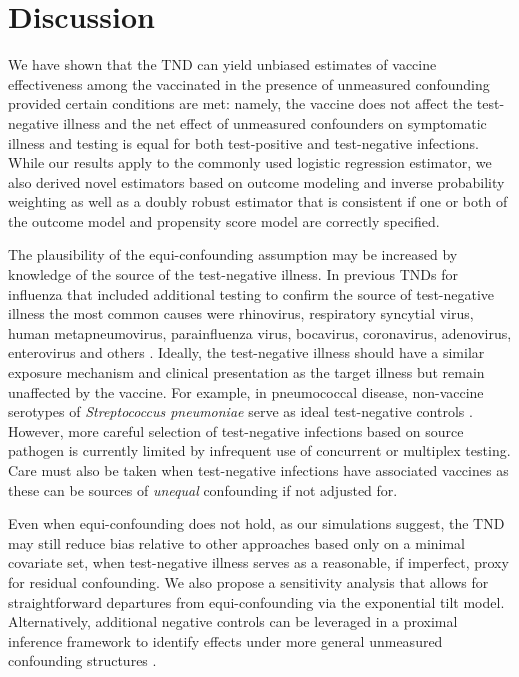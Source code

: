 \documentclass[11pt]{article}
\begin{document}
\section*{Discussion} \label{sec:discussion}

We have shown that the TND can yield unbiased estimates of vaccine effectiveness among the vaccinated in the presence of unmeasured confounding provided certain conditions are met: namely, the vaccine does not affect the test-negative illness and the net effect of unmeasured confounders  on symptomatic illness and testing is equal for both test-positive and test-negative infections. While our results apply to the commonly used logistic regression estimator, we also derived novel estimators based on outcome modeling and inverse probability weighting as well as a doubly robust estimator that is consistent if one or both of the outcome model and propensity score model are correctly specified.

The plausibility of the equi-confounding assumption may be increased by knowledge of the source of the test-negative illness.  In previous TNDs for influenza that included additional testing to confirm the source of test-negative illness the most common causes were rhinovirus, respiratory syncytial virus, human metapneumovirus, parainfluenza virus, bocavirus, coronavirus, adenovirus, enterovirus and others \cite{chua_use_2020-1}. Ideally, the test-negative illness should have a similar exposure mechanism and clinical presentation as the target illness but remain unaffected by the vaccine. For example, in pneumococcal disease, non-vaccine serotypes of \textit{Streptococcus pneumoniae} serve as ideal test-negative controls \cite{broome_pneumococcal_1980}. However, more careful selection of test-negative infections based on source pathogen is currently limited by infrequent use of concurrent or multiplex testing. Care must also be taken when test-negative infections have associated vaccines as these can be sources of \textit{unequal} confounding if not adjusted for.

Even when equi-confounding does not hold, as our simulations suggest, the TND may still reduce bias relative to other approaches based only on a minimal covariate set, when test-negative illness serves as a reasonable, if imperfect, proxy for residual confounding. We also propose a sensitivity analysis that allows for straightforward departures from equi-confounding via the exponential tilt model. Alternatively, additional negative controls can be leveraged in a proximal inference framework to identify effects under more general unmeasured confounding structures \cite{li_double_2023}.
\end{document}
